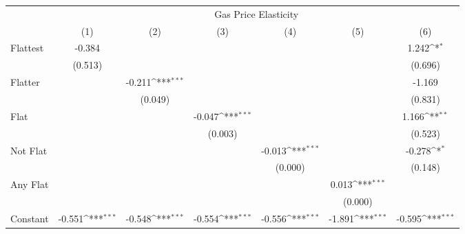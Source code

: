 {
\def\sym#1{\ifmmode^{#1}\else\(^{#1}\)\fi}
\begin{tabular}{l*{6}{c}}
\hline\hline
            &\multicolumn{6}{c}{Gas Price Elasticity}                                                                                           \\
            &\multicolumn{1}{c}{(1)}         &\multicolumn{1}{c}{(2)}         &\multicolumn{1}{c}{(3)}         &\multicolumn{1}{c}{(4)}         &\multicolumn{1}{c}{(5)}         &\multicolumn{1}{c}{(6)}         \\
\hline
Flattest    &      -0.384         &                     &                     &                     &                     &       1.242\sym{*}  \\
            &     (0.513)         &                     &                     &                     &                     &     (0.696)         \\
[1em]
Flatter     &                     &      -0.211\sym{***}&                     &                     &                     &      -1.169         \\
            &                     &     (0.049)         &                     &                     &                     &     (0.831)         \\
[1em]
Flat        &                     &                     &      -0.047\sym{***}&                     &                     &       1.166\sym{**} \\
            &                     &                     &     (0.003)         &                     &                     &     (0.523)         \\
[1em]
Not Flat    &                     &                     &                     &      -0.013\sym{***}&                     &      -0.278\sym{*}  \\
            &                     &                     &                     &     (0.000)         &                     &     (0.148)         \\
[1em]
Any Flat    &                     &                     &                     &                     &       0.013\sym{***}&                     \\
            &                     &                     &                     &                     &     (0.000)         &                     \\
[1em]
Constant    &      -0.551\sym{***}&      -0.548\sym{***}&      -0.554\sym{***}&      -0.556\sym{***}&      -1.891\sym{***}&      -0.595\sym{***}\\

\end{tabular}}
